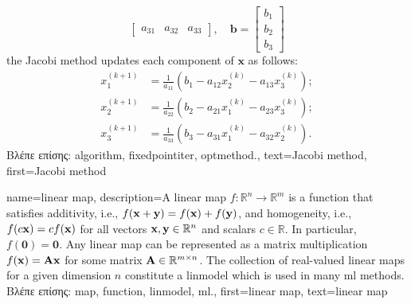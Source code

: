 {{\[\begin{bmatrix}
		 	a_{31} & a_{32} & a_{33}
		 \end{bmatrix}, \quad
		 \mathbf{b} = \begin{bmatrix}
		 	b_1 \\
		 	b_2 \\
		 	b_3
		 \end{bmatrix} 
		 \]
		 the Jacobi method updates each component of \( \mathbf{x} \) as follows:
		 \[
		 \begin{aligned}
		 	x_1^{(k+1)} &= \frac{1}{a_{11}} \left( b_1 - a_{12} x_2^{(k)} - a_{13} x_3^{(k)} \right); \\
		 	x_2^{(k+1)} &= \frac{1}{a_{22}} \left( b_2 - a_{21} x_1^{(k)} - a_{23} x_3^{(k)} \right); \\
		 	x_3^{(k+1)} &= \frac{1}{a_{33}} \left( b_3 - a_{31} x_1^{(k)} - a_{32} x_2^{(k)} \right).
		 \end{aligned}
		 \]
		\foreignlanguage{greek}{Βλέπε επίσης:} \gls{algorithm}, \gls{fixedpointiter}, \gls{optmethod}.},
	text={Jacobi method}, 
	first={Jacobi method}
}


{name={linear map},
	description={A linear \gls{map} $f: \mathbb{R}^n \rightarrow \mathbb{R}^m$ is a \gls{function} that 
		satisfies additivity, i.e., $f({\bf x} + {\bf y}) = f({\bf x}) + f({\bf y})$, and homogeneity, i.e., 
		$f(c{\bf x}) = c f({\bf x})$ for all vectors ${\bf x}, {\bf y} \in \mathbb{R}^n$ and scalars $c \in \mathbb{R}$. 
		In particular, $f(\mathbf{0}) = \mathbf{0}$. Any linear \gls{map} can be represented as a matrix 
		multiplication $f({\bf x}) = {\bf A} {\bf x}$ for some matrix ${\bf A} \in \mathbb{R}^{m \times n}$. 
		The collection of real-valued linear \gls{map}s for a given dimension $n$ constitute a \gls{linmodel} 
		which is used in many \gls{ml} methods.\\
		\foreignlanguage{greek}{Βλέπε επίσης:} \gls{map}, \gls{function}, \gls{linmodel}, \gls{ml}.},
	first={linear map},
	text={linear map}
}

